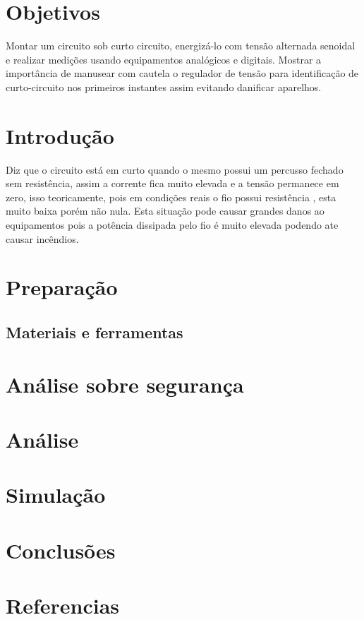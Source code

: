 \documentclass[a4paper, 12pt]{article}
\begin{document}
\tableofcontents

\thispagestyle{empty}

\newpage
{}
\section{Objetivos}
\mbox{}
Montar um circuito sob curto circuito, energizá-lo com tensão alternada senoidal e realizar medições usando equipamentos analógicos e digitais. Mostrar a importância de manusear com cautela o regulador de tensão para identificação de curto-circuito nos primeiros instantes assim evitando danificar aparelhos.
\section{Introdução}
\mbox{}
Diz que o circuito está em curto quando o mesmo possui um percusso fechado sem resistência, assim a corrente fica muito elevada e a tensão permanece em zero, isso teoricamente, pois em condições reais o fio possui resistência , esta muito baixa porém não nula. Esta situação pode causar grandes danos ao equipamentos pois a potência dissipada pelo fio  é muito elevada podendo ate causar incêndios.


\newpage
\section{Preparação}
\mbox{}
\subsection{Materiais e ferramentas}
\mbox{}

\newpage
\section{Análise sobre segurança}

\newpage
\section{Análise}
\newpage
\section{Simulação}
\newpage
\section{Conclusões}
\newpage
{}
\section*{Referencias}
\newpage
\end{document}
